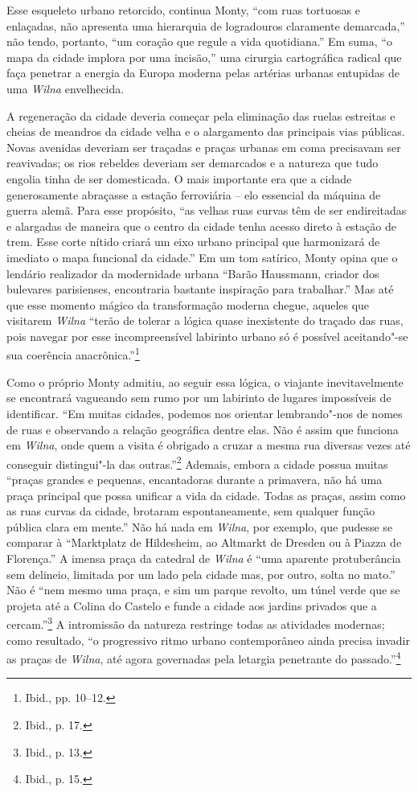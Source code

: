 Esse esqueleto urbano retorcido, continua Monty, ``com ruas tortuosas e
enlaçadas, não apresenta uma hierarquia de logradouros claramente
demarcada,'' não tendo, portanto, ``um coração que regule a vida
quotidiana.'' Em suma, ``o mapa da cidade implora por uma incisão,'' uma
cirurgia cartográfica radical que faça penetrar a energia da Europa
moderna pelas artérias urbanas entupidas de uma \textit{Wilna} envelhecida.

A regeneração da cidade deveria começar pela eliminação das ruelas
estreitas e cheias de meandros da cidade velha e o alargamento das
principais vias públicas. Novas avenidas deveriam ser traçadas e praças
urbanas em coma precisavam ser reavivadas; os rios rebeldes deveriam ser
demarcados e a natureza que tudo engolia tinha de ser domesticada. O
mais importante era que a cidade generosamente abraçasse a estação
ferroviária -- elo essencial da máquina de guerra alemã. Para esse
propósito, ``as velhas ruas curvas têm de ser endireitadas e alargadas
de maneira que o centro da cidade tenha acesso direto à estação de trem.
Esse corte nítido criará um eixo urbano principal que harmonizará de
imediato o mapa funcional da cidade.'' Em um tom satírico, Monty opina
que o lendário realizador da modernidade urbana ``Barão Haussmann,
criador dos bulevares parisienses, encontraria bastante inspiração para
trabalhar.'' Mas até que esse momento mágico da transformação moderna
chegue, aqueles que visitarem \textit{Wilna} ``terão de tolerar a lógica quase
inexistente do traçado das ruas, pois navegar por esse incompreensível
labirinto urbano só é possível aceitando"-se sua coerência
anacrônica.''\footnote{Ibid., pp. 10--12.}

Como o próprio Monty admitiu, ao seguir essa lógica, o viajante
inevitavelmente se encontrará vagueando sem rumo por um labirinto de
lugares impossíveis de identificar. ``Em muitas cidades, podemos nos
orientar lembrando"-nos de nomes de ruas e observando a relação
geográfica dentre elas. Não é assim que funciona em \textit{Wilna}, onde quem a
visita é obrigado a cruzar a mesma rua diversas vezes até conseguir
distingui"-la das outras.''\footnote{Ibid., p. 17.} Ademais, embora a
cidade possua muitas ``praças grandes e pequenas, encantadoras durante a
primavera, não há uma praça principal que possa unificar a vida da
cidade. Todas as praças, assim como as ruas curvas da cidade, brotaram
espontaneamente, sem qualquer função pública clara em mente.'' Não há
nada em \textit{Wilna}, por exemplo, que pudesse se comparar à ``Marktplatz de
Hildesheim, ao Altmarkt de Dresden ou à Piazza de Florença.'' A imensa
praça da catedral de \textit{Wilna} é ``uma aparente protuberância sem delineio,
limitada por um lado pela cidade mas, por outro, solta no mato.'' Não é
``nem mesmo uma praça, e sim um parque revolto, um túnel verde que se
projeta até a Colina do Castelo e funde a cidade aos jardins privados
que a cercam.''\footnote{Ibid., p. 13.} A intromissão da natureza
restringe todas as atividades modernas; como resultado, ``o progressivo
ritmo urbano contemporâneo ainda precisa invadir as praças de \textit{Wilna}, até
agora governadas pela letargia penetrante do passado.''\footnote{Ibid., p. 15.}

